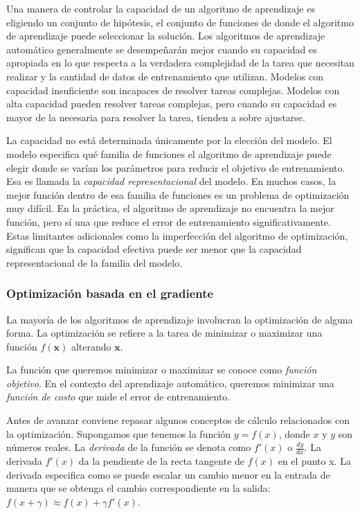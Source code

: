 Una manera de controlar la capacidad de un algoritmo de aprendizaje es
eligiendo un conjunto de hipótesis, el conjunto de funciones de donde el
algoritmo de aprendizaje puede seleccionar la solución. 
Los algoritmos de aprendizaje automático generalmente se desempeñarán
mejor cuando su capacidad es apropiada en lo que respecta a la verdadera
complejidad de la tarea que necesitan realizar y la cantidad de datos de
entrenamiento que utilizan. Modelos con capacidad insuficiente son
incapaces de resolver tareas complejas. Modelos con alta capacidad
pueden resolver tareas complejas, pero cuando su capacidad es mayor de
la necesaria para resolver la tarea, tienden a sobre ajustarse.

La capacidad no está determinada únicamente por la elección del modelo.
El modelo especifica qué familia de funciones el algoritmo de
aprendizaje puede elegir donde se varían los parámetros para reducir el
objetivo de entrenamiento. Esa es llamada la \textit{capacidad representacional}
del modelo. En muchos casos, la mejor función dentro de esa familia de
funciones es un problema de optimización muy difícil. En la práctica, el
algoritmo de aprendizaje no encuentra la mejor función, pero sí una que
reduce el error de entrenamiento significativamente. Estas limitantes
adicionales como la imperfección del algoritmo de optimización,
significan que la capacidad efectiva puede ser menor que la capacidad
representacional de la familia del modelo.


\subsubsection{Optimización basada en el gradiente}

La mayoría de los algoritmos de aprendizaje involucran la optimización 
de alguna forma. La optimización se refiere a la tarea de 
minimizar o maximizar una función $f(\mathbf{x})$ alterando $\mathbf{x}$.

La función que queremos minimizar o maximizar se conoce como \textit{función objetivo}.
En el contexto del aprendizaje automático, queremos minimizar una \textit{función
de costo} que mide el error de entrenamiento. 

Antes de avanzar conviene repasar algunos conceptos de cálculo
relacionados con la optimización.
Supongamos que tenemos la función $y = f(x)$, donde $x$ y $y$ son números reales.
La \textit{derivada} de la función se denota como $f'(x)$ o $\frac{dy}{dx}$.
La derivada $f'(x)$ da la pendiente de la recta tangente de $f(x)$ en el punto x.
La derivada
especifica como se puede escalar un cambio menor en la entrada de manera que se obtenga
el cambio correspondiente en la salida: $f(x + \gamma) \approx f(x) + \gamma f'(x)$.

